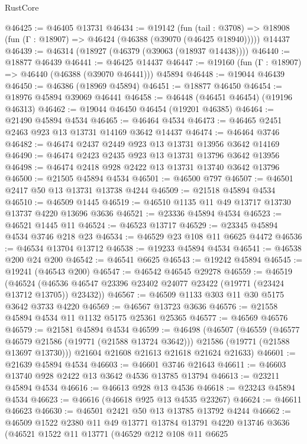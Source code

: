 \begin{lexlean}{RustCore}
\begin{coremodule}
@46425 := @46405 @13731
@46434 := @19142
    (fun (tail : @3708) => @18908 (fun (Γ : @18907) => @46424 (@46388 (@39070 (@46425 @18940)))))
    @14437
@46439 := @46314 (@18927 (@46379 (@39063 (@18937 @14438))))
@46440 := @18877 @46439
@46441 := @46425 @14437
@46447 := @19160 (fun (Γ : @18907) => @46440 (@46388 (@39070 @46441))) @45894
@46448 := @19044 @46439
@46450 := @46386 (@18969 @45894)
@46451 := @18877 @46450
@46454 := @18976 @45894 @39069 @46441
@46458 := @46448 (@46451 @46454) (@19196 @46313)
@46462 := @19044 @46450 @46454 (@19201 @46385)
@46464 := @21490 @45894 @4534
@46465 := @46464 @4534
@46473 := @46465 @2451 @2463 @923 @13 @13731 @14169 @3642 @14437
@46474 := @46464 @3746
@46482 := @46474 @2437 @2449 @923 @13 @13731 @13956 @3642 @14169
@46490 := @46474 @2423 @2435 @923 @13 @13731 @13796 @3642 @13956
@46498 := @46474 @2418 @928 @2422 @13 @13731 @13740 @3642 @13796
@46500 := @21505 @45894 @4534
@46501 := @46500 @797
@46507 := @46501 @2417 @50 @13 @13731 @13738 @4244
@46509 := @21518 @45894 @4534
@46510 := @46509 @1445
@46519 := @46510 @1135 @11 @49 @13717 @13730 @13737 @4220 @13696 @3636
@46521 := @23336 @45894 @4534
@46523 := @46521 @1445 @11
@46524 := @46523 @13717
@46529 := @23345 @45894 @4534 @3746 @218 @23
@46534 := @46529 @23 @108 @11 @6625 @4472
@46536 := @46534 @13704 @13712
@46538 := @19233 @45894 @4534
@46541 := @46538 @200 @24 @200
@46542 := @46541 @6625
@46543 := @19242 @45894
@46545 := @19241 (@46543 @200)
@46547 := @46542 @46545 @29278
@46559 := @46519
    (@46524 (@46536 @46547 @23396 @23402 @24077 @23422 (@19771 (@23424 @13712 @13705)) @23432))
@46567 := @46509 @1133 @303 @11 @30 @5175 @3642 @3733 @4220
@46569 := @46567 @13723 @3636
@46576 := @21558 @45894 @4534 @11 @1132 @5175 @25361 @25365
@46577 := @46569 @46576
@46579 := @21581 @45894 @4534
@46599 := @46498
    (@46507
      (@46559
        (@46577 @46579 @21586 (@19771 (@21588 @13724 @3642)))
        @21586
        (@19771 (@21588 @13697 @13730)))
      @21604
      @21608
      @21613
      @21618
      @21624
      @21633)
@46601 := @21639 @45894 @4534
@46603 := @46601 @3746 @21643
@46611 := @46603 @13740 @928 @2422 @13 @3642 @4536 @13785 @13794
@46613 := @23211 @45894 @4534
@46616 := @46613 @928 @13 @4536
@46618 := @23243 @45894 @4534
@46623 := @46616 (@46618 @925 @13 @4535 @23267)
@46624 := @46611 @46623
@46630 := @46501 @2421 @50 @13 @13785 @13792 @4244
@46662 := @46509
    @1522
    @2380
    @11
    @49
    @13771
    @13784
    @13791
    @4220
    @13746
    @3636
    (@46521
      @1522
      @11
      @13771
      (@46529
        @212
        @108
        @11
        @6625

\end{coremodule}
\end{lexlean}
